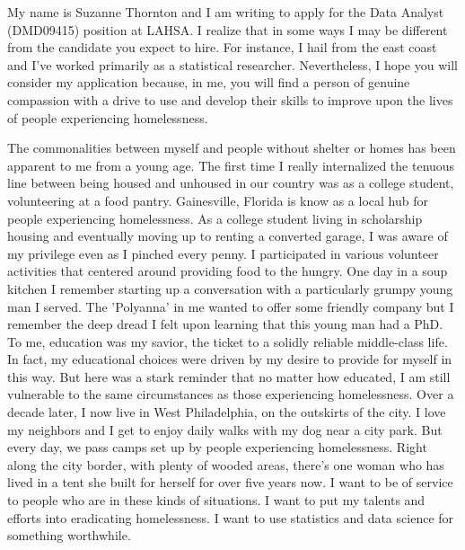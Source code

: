 \documentclass[11pt,a4paper,sans]{moderncv}
\begin{document}

	
	My name is Suzanne Thornton and I am writing to apply for the Data Analyst (DMD09415) position at LAHSA. I realize that in some ways I may be different from the candidate you expect to hire. For instance, I hail from the east coast and I've worked primarily as a statistical researcher. Nevertheless, I hope you will consider my application because, in me, you will find a person of genuine compassion with a drive to use and develop their skills to improve upon the lives of people experiencing homelessness.    
	
	The commonalities between myself and people without shelter or homes has been apparent to me from a young age. The first time I really internalized the tenuous line between being housed and unhoused in our country was as a college student, volunteering at a food pantry. Gainesville, Florida is know as a local hub for people experiencing homelessness. As a college student living in scholarship housing and eventually moving up to renting a converted garage, I was aware of my privilege even as I pinched every penny. I participated in various volunteer activities that centered around providing food to the hungry. One day in a soup kitchen I remember starting up a conversation with a particularly grumpy young man I served. The 'Polyanna' in me wanted to offer some friendly company but I remember the deep dread I felt upon learning that this young man had a PhD. To me, education was my savior, the ticket to a solidly reliable middle-class life. In fact, my educational choices were driven by my desire to provide for myself in this way. But here was a stark reminder that no matter how educated, I am still vulnerable to the same circumstances as those experiencing homelessness. Over a decade later, I now live in West Philadelphia, on the outskirts of the city. I love my neighbors and I get to enjoy daily walks with my dog near a city park. But every day, we pass camps set up by people experiencing homelessness. Right along the city border, with plenty of wooded areas, there's one woman who has lived in a tent she built for herself for over five years now. I want to be of service to people who are in these kinds of situations. I want to put my talents and efforts into eradicating homelessness. I want to use statistics and data science for something worthwhile. 
	
\end{document}

